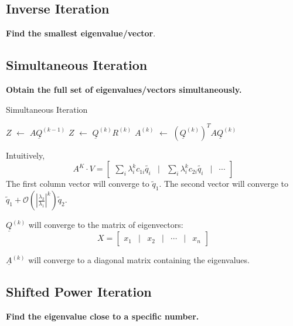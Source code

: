 \documentclass[12pt]{article}
\theoremstyle{definition}
\newcommand*\Let[2]{\State #1 $\gets$ #2}
\theoremstyle{definition}
\begin{document}
\subsection{Inverse Iteration}
\textbf{Find the smallest eigenvalue/vector}. 

\subsection{Simultaneous Iteration}
\textbf{Obtain the full set of eigenvalues/vectors simultaneously.}

\begin{algorithm}[ht]
  \caption{Simultaneous Iteration}
  \begin{algorithmic}[1]
	    \Let{$Z$}{$A \underline Q^{(k-1)}$} 
	    \Let{$Z$}{$\underline Q^{(k)} R^{(k)}$} 
	    \Let{$A^{(k)}$}{$(\underline Q^{(k)})^T A \underline Q^{(k)}$}  
    \EndFor
  \end{algorithmic}
\end{algorithm}

Intuitively, 
\begin{equation}
	A^K \cdot V = 
	\begin{bmatrix}
	\sum_i \lambda_i^k c_{1i} \tilde{q_i} &\vert & \sum_i \lambda_i^k c_{2i} \tilde{q_i}&\vert & \cdots
	\end{bmatrix}
\end{equation}
The first column vector will converge to $\tilde{q}_1$. The second vector will converge to $\tilde{q}_1 + \mathcal{O}\left( \left\vert \frac{\lambda_2}{\lambda_1} \right\vert^k \right) \tilde{q}_2$. 

$\underline Q^{(k)}$ will converge to the matrix of eigenvectors:
\begin{equation}
	X = 
	\begin{bmatrix}
	x_1 &|& x_2 &|& \cdots &|&x_n 
	\end{bmatrix}
\end{equation}

$\underline A^{(k)}$ will converge to a diagonal matrix containing the eigenvalues.

\subsection{Shifted Power Iteration}
\textbf{Find the eigenvalue close to a specific number.}
\end{document}

